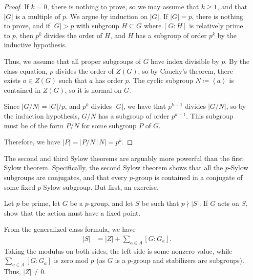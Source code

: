 \documentclass[10pt]{mypackage}
\begin{document}
\begin{proof}
  If $k = 0$, there is nothing to prove, so we may assume that $k\geq 1$, and that $\left\vert G \right\vert$ is a multiple of $p$. We argue by induction on $\left\vert G \right\vert$. If $\left\vert G \right\vert = p$, there is nothing to prove, and if $\left\vert G \right\vert > p$ with subgroup $H\subseteq G$ where $\left[ G:H \right]$ is relatively prime to $p$, then $p^{k}$ divides the order of $H$, and $H$ has a subgroup of order $p^{k}$ by the inductive hypothesis.\newline

  Thus, we assume that all proper subgroups of $G$ have index divisible by $p$. By the class equation, $p$ divides the order of $Z(G)$, so by Cauchy's theorem, there exists $a\in Z(G)$ such that $a$ has order $p$. The cyclic subgroup $N\coloneq \left\langle a \right\rangle$ is contained in $Z(G)$, so it is normal on $G$.\newline

  Since $\left\vert G/N \right\vert = \left\vert G \right\vert/p$, and $p^{k}$ divides $\left\vert G \right\vert$, we have that $p^{k-1}$ divides $\left\vert G/N \right\vert$, so by the induction hypothesis, $G/N$ has a subgroup of order $p^{k-1}$. This subgroup must be of the form $P/N$ for some subgroup $P$ of $G$.\newline

  Therefore, we have $\left\vert P \right\vert = \left\vert P/N \right\vert\left\vert N \right\vert = p^{k}$.
\end{proof}
The second and third Sylow theorems are arguably more powerful than the first Sylow theorem. Specifically, the second Sylow theorem shows that all the $p$-Sylow subgroups are conjugates, and that every $p$-group is contained in a conjugate of some fixed $p$-Sylow subgroup. But first, an exercise.
\begin{exercise}
  Let $p$ be prime, let $G$ be a $p$-group, and let $S$ be such that $p \nmid \left\vert S \right\vert$. If $G$ acts on $S$, show that the action must have a fixed point.
\end{exercise}
\begin{solution}
  From the generalized class formula, we have
  \begin{align*}
    \left\vert S \right\vert &= \left\vert Z \right\vert + \sum_{a\in A} \left[ G:G_a \right].
  \end{align*}
  Taking the modulus on both sides, the left side is some nonzero value, while $\sum_{a\in A}\left[ G:G_a \right]$ is zero mod $p$ (as $G$ is a $p$-group and stabilizers are subgroups). Thus, $\left\vert Z \right\vert\neq 0$.
\end{solution}
\end{document}
